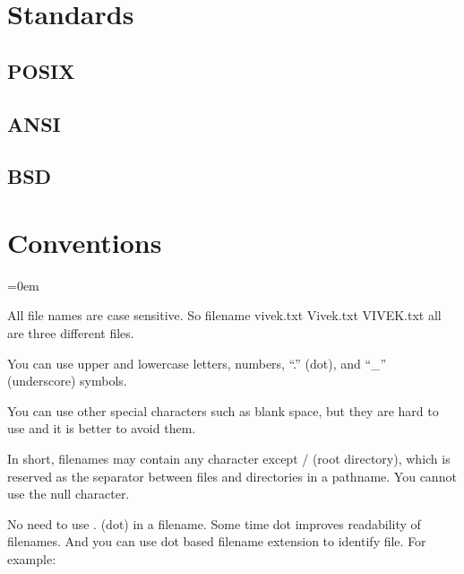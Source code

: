 

\twocolumn
\sectionend

\section{Standards}
\label{sec:standards}

\subsection{POSIX}
\label{ssec:posix}


\subsectionend

\subsection{ANSI}
\label{ssec:ansi}


\subsectionend

\subsection{BSD}
\label{ssec:bsd}


\subsectionend

\sectionend

\section{Conventions}
\label{sec:conventions}
\parindent=0em


All file names are case sensitive. So filename vivek.txt Vivek.txt VIVEK.txt all
are three different files.

You can use upper and lowercase letters, numbers, “.” (dot), and “\_”
(underscore) symbols.

You can use other special characters such as blank space, but they are hard to
use and it is better to avoid them.

In short, filenames may contain any character except / (root directory), which
is reserved as the separator between files and directories in a pathname. You
cannot use the null character.

No need to use . (dot) in a filename. Some time dot improves readability of
filenames. And you can use dot based filename extension to identify file. For
example:

